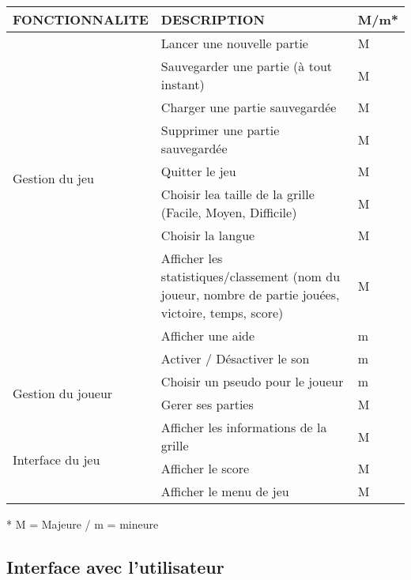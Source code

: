 \documentclass[11pt]{article}
\begin{document}
\small
\begin{tabular}{|p{4cm}|p{10cm}|p{1cm}|}
  \hline
  \textbf{FONCTIONNALITE} & \textbf{DESCRIPTION} & \textbf{M/m*}\\
  \hline
     \multirow{8}{*}{Gestion du jeu}
        & Lancer une nouvelle partie                                  & M \\  \cline{2-3}
        & Sauvegarder une partie (à tout instant)                     & M \\  \cline{2-3}
        & Charger une partie sauvegardée                              & M \\  \cline{2-3}
        & Supprimer une partie sauvegardée                            & M \\  \cline{2-3}
        & Quitter le jeu                                              & M \\  \cline{2-3}
        & Choisir lea taille de la grille (Facile, Moyen, Difficile)  & M \\  \cline{2-3}
        & Choisir la langue                                           & M \\  \cline{2-3}
        & Afficher les statistiques/classement (nom du joueur, nombre de partie jouées, victoire, temps, score) & M \\  \cline{2-3}
        & Afficher une aide                                           & m \\  \cline{2-3}
        & Activer / Désactiver le son                                 & m \\
  \hline
     \multirow{2}{*}{Gestion du joueur}
        & Choisir un pseudo pour le joueur                                            & m \\  \cline{2-3}           & Gerer ses parties 														  & M \\  \cline{2-3}
  \hline
     \multirow{3}{*}{Interface du jeu}
        & Afficher les informations de la grille                                                 & M \\  \cline{2-3}
        & Afficher le score                                                       & M \\  \cline{2-3}
        & Afficher le menu de jeu                                                     & M \\
  \hline
\end{tabular}
\normalsize

* M = Majeure / m = mineure



\subsection{Interface avec l'utilisateur}
\end{document}
